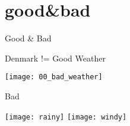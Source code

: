 \section{good&bad}




\begin{frame}{Good \& Bad}

Denmark != Good Weather
\begin{center}
\texttt{[image: 00\_bad\_weather]}
\end{center}

\end{frame}

\begin{frame}{Bad}

\begin{center}
\texttt{[image: rainy]}
\texttt{[image: windy]}
\end{center}

\end{frame}

